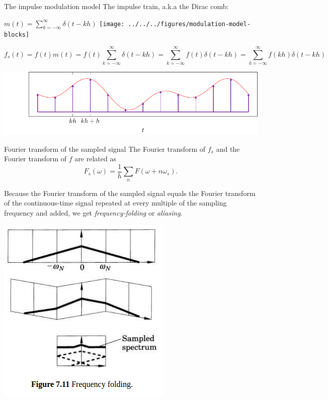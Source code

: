 \documentclass[presentation,aspectratio=169]{beamer}
\begin{document}
\begin{frame}[label={sec:org1c94273}]{The impulse modulation model}
The \alert{impulse train}, a.k.a the \alert{Dirac comb}:
\begin{center}
\(m(t) = \sum_{k=-\infty}^{\infty} \delta(t-kh)\)\hspace*{10mm}
 \texttt{[image: ../../../figures/modulation-model-blocks]}
\end{center}

\[f_s(t) = f(t)m(t) = f(t) \sum_{k=-\infty}^{\infty} \delta(t-kh) = \sum_{k=-\infty}^{\infty} f(t)\delta(t-kh) = \sum_{k=-\infty}^{\infty} f(kh) \delta(t-kh) \]


\begin{center}
\includegraphics[width=0.8\linewidth]{../../figures/modulation-model-timeseries}
\end{center}
\end{frame}

\begin{frame}[label={sec:org5b6339a}]{Fourier transform of the sampled signal}
The Fourier transform of \(f_s\) and the Fourier transform of \(f\) are related as
\[ F_s(\omega) = \frac{1}{h} \sum_n F(\omega + n\omega_s). \]

Because the Fourier transform of the sampled signal equals the Fourier transform of the continuous-time signal repeated at every multiple of the sampling frequency and added, we get \emph{frequency-folding} or \emph{aliasing}.

\begin{center}
\includegraphics[width=0.28\linewidth]{../../figures/frequency-folding.png}
\end{center}
\end{frame}
\end{document}
